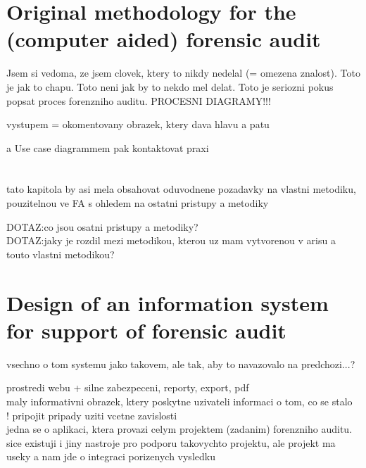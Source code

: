 \newcommand{\komentar}[1]{{\leavevmode\color[rgb]{1.0, 0.13, 0.32}#1}}
\newcommand{\sediva}[1]{{\leavevmode\color[rgb]{0.5, 0.5, 0.5}#1}}
\newcommand{\dotaz}[1]{{\leavevmode\color[rgb]{0.0, 0.5, 1.0}DOTAZ:#1\\}}
\newcommand*{\anglictina}[1]{\noindent\colorbox{green!30}{\parbox{0.98\linewidth}{\textcolor{green!80}{AJ }#1\\}}}
\newcommand{\hilight}[1]{\colorbox{yellow}{#1}}


\setcounter{chapter}{0}
\setcounter{section}{1}

 






\chapter{Original methodology for the (computer aided) forensic audit}
\komentar{Jsem si vedoma, ze jsem clovek, ktery to nikdy nedelal (= omezena znalost).
Toto je jak to chapu. Toto neni jak by to nekdo mel delat. Toto je seriozni pokus popsat proces forenzniho auditu.
PROCESNI DIAGRAMY!!!

vystupem = okomentovany obrazek, ktery dava hlavu a patu

a Use case diagrammem pak kontaktovat praxi

}

\chapter{}
\komentar{
tato kapitola by asi mela obsahovat oduvodnene pozadavky na vlastni metodiku, pouzitelnou ve FA s ohledem na ostatni pristupy a metodiky
}

\dotaz{co jsou osatni pristupy a metodiky?}
\dotaz{jaky je rozdil mezi metodikou, kterou uz mam vytvorenou v arisu a touto vlastni metodikou?}


\chapter{Design of an information system for support of forensic audit}
\komentar{
vsechno o tom systemu jako takovem, ale tak, aby to navazovalo na predchozi...?

prostredi webu + silne zabezpeceni, reporty, export, pdf\\
maly informativni obrazek, ktery poskytne uzivateli informaci o tom, co se stalo\\
! pripojit pripady uziti vcetne zavislosti\\

jedna se o aplikaci, ktera provazi celym projektem (zadanim) forenzniho auditu. sice existuji i jiny nastroje pro podporu takovychto projektu, ale projekt ma useky a nam jde o integraci porizenych vysledku

}



